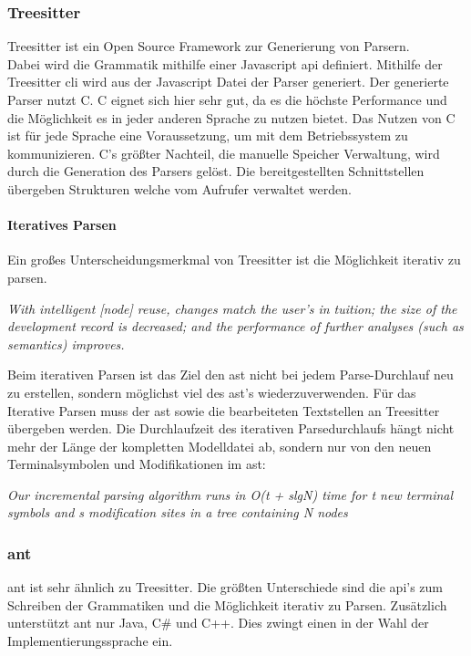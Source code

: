\documentclass[./einleitung.tex]{subfiles}
\begin{document}
\subsubsection{Treesitter}
Treesitter ist ein Open Source Framework zur Generierung von Parsern. \\
Dabei wird die Grammatik mithilfe einer Javascript \acrlong{api} definiert.
Mithilfe der Treesitter \acrlong{cli} wird aus der Javascript Datei der Parser generiert.
Der generierte Parser nutzt C.
C eignet sich hier sehr gut, da es die höchste Performance und die Möglichkeit es in jeder anderen Sprache zu nutzen bietet.
Das Nutzen von C ist für jede Sprache eine Voraussetzung, um mit dem Betriebssystem zu kommunizieren.
C's größter Nachteil, die manuelle Speicher Verwaltung, wird durch die Generation des Parsers gelöst.
Die bereitgestellten Schnittstellen übergeben Strukturen welche vom Aufrufer verwaltet werden.
\paragraph{Iteratives Parsen}
Ein großes Unterscheidungsmerkmal von Treesitter ist die Möglichkeit iterativ zu parsen.
\newline
 \begin{center}
 \textit{With intelligent [node] reuse, changes match the user’s in
tuition; the size of the development record is decreased; and the performance
 of further analyses (such as semantics) improves.\cite{twagner}}
 \end{center}
Beim iterativen Parsen ist das Ziel den \acrshort{ast} nicht bei jedem Parse-Durchlauf neu zu erstellen, sondern möglichst viel des \acrshort{ast}'s wiederzuverwenden.
Für das Iterative Parsen muss der \acrshort{ast} sowie die bearbeiteten Textstellen an Treesitter übergeben werden.
Die Durchlaufzeit des iterativen Parsedurchlaufs hängt nicht mehr der Länge der kompletten Modelldatei ab, sondern nur von den neuen Terminalsymbolen und Modifikationen im \acrshort{ast}:
 \newline
 \begin{center}
 \textit{Our incremental parsing algorithm runs in O(t + slgN) time for t new terminal symbols and s modification sites in a tree containing N nodes \cite{twagner}}
 \end{center}
\subsubsection{\acrfull{ant}}
\acrshort{ant} ist sehr ähnlich zu Treesitter.
Die größten Unterschiede sind die \acrlong{api}'s zum Schreiben der Grammatiken und die Möglichkeit iterativ zu Parsen.
Zusätzlich unterstützt \acrshort{ant} nur Java, C\# und C++.
Dies zwingt einen in der Wahl der Implementierungssprache ein.
\end{document}
